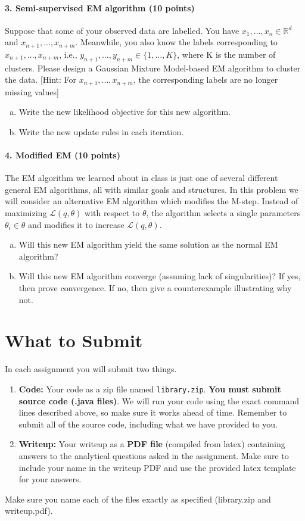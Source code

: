 \documentclass[11pt]{article}
\begin{document}
\paragraph{3. Semi-supervised EM algorithm (10 points)}
Suppose that some of your observed data are labelled. You have $x_1,...,x_n\in\mathbb{R}^{d}$ and $x_{n+1},...,x_{n+m}$. Meanwhile, you also know the labels corresponding to $x_{n+1},...,x_{n+m}$, i.e., $y_{n+1},...,y_{n+m}\in\{1,...,K\}$, where K is the number of clusters. Please design a Gaussian Mixture Model-based EM algorithm to cluster the data. [Hint: For $x_{n+1},...,x_{n+m}$, the corresponding labels are no longer missing values]
\begin{enumerate}[(a)]
\item Write the new likelihood objective for this new algorithm.
\item Write the new update rules in each iteration.
\end{enumerate}

\paragraph{4. Modified EM (10 points)}
The EM algorithm we learned about in class is just one of several different general EM algorithms, all with similar goals and structures.  In this problem we will consider an alternative EM algorithm which modifies the M-step. Instead of maximizing $\mathcal{L}(q,\theta)$ with respect to $\theta$, the algorithm selects a single parameters $\theta_i \in \theta$ and modifies
it to increase $\mathcal{L}(q,\theta)$.

\begin{enumerate}[(a)]
\item Will this new EM algorithm yield the same solution as the normal EM algorithm?
\item Will this new EM algorithm converge (assuming lack of singularities)? If yes, then prove convergence. If no, then give a counterexample illustrating why not.
\end{enumerate}



\section{What to Submit}
In each assignment you will submit two things.
\begin{enumerate}
\item {\bf Code:} Your code as a zip file named {\tt library.zip}. {\bf You must submit source code (.java files)}. We will run your code using the exact command lines described above, so make sure it works ahead of time. Remember to submit all of the source code, including what we have provided to you.
\item {\bf Writeup:} Your writeup as a {\bf PDF file} (compiled from latex) containing answers to the analytical questions asked in the assignment. Make sure to include your name in the writeup PDF and use the provided latex template for your answers.
\end{enumerate}
Make sure you name each of the files exactly as specified (library.zip and writeup.pdf).
\end{document}
